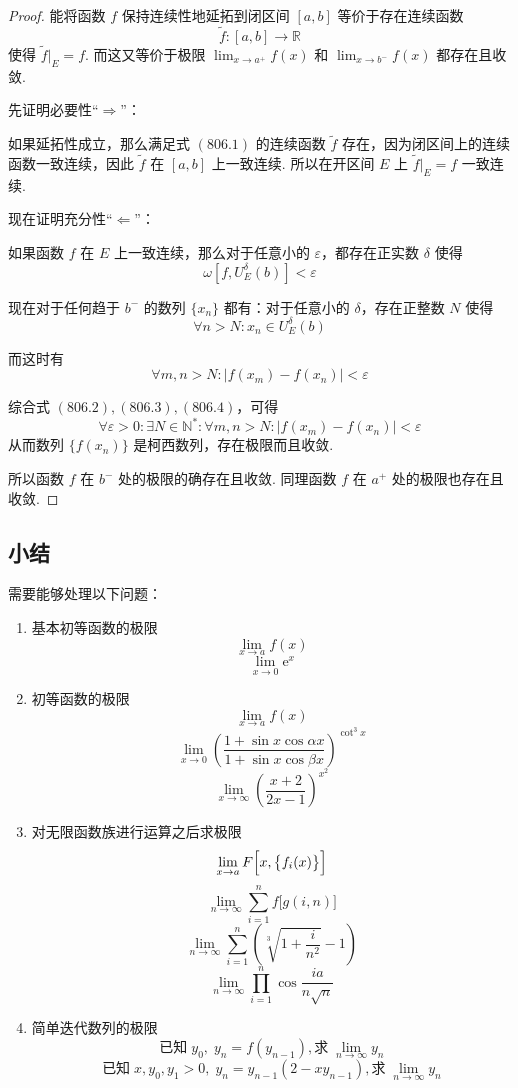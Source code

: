 \begin{proof}
    能将函数 $f$ 保持连续性地延拓到闭区间 $[a,b]$ 等价于存在连续函数
    \[\tilde{f}: [a,b] \rightarrow \mathbb{R} \tag{806.1}\]
    使得 $\tilde{f}|_E = f$. 而这又等价于极限 $\displaystyle \lim_{x \rightarrow a^+} f(x)$ 和 $\displaystyle \lim_{x \rightarrow b^-} f(x)$ 都存在且收敛.

    先证明必要性“$\Rightarrow$”：

    如果延拓性成立，那么满足式 $(806.1)$ 的连续函数 $\tilde{f}$ 存在，因为闭区间上的连续函数一致连续，因此 $\tilde{f}$ 在 $[a,b]$ 上一致连续. 所以在开区间 $E$ 上 $\tilde{f}|_E = f$ 一致连续.

    现在证明充分性“$\Leftarrow$”：

    如果函数 $f$ 在 $E$ 上一致连续，那么对于任意小的 $\varepsilon$，都存在正实数 $\delta$ 使得
    \[\omega[f, U_E^\delta(b)] < \varepsilon \tag{806.2}\]

    现在对于任何趋于 $b^-$ 的数列 $\{x_n\}$ 都有：对于任意小的 $\delta$，存在正整数 $N$ 使得
    \[\forall n > N: x_n \in U_E^\delta(b) \tag{806.3}\]

    而这时有
    \[\forall m,n > N: \lvert f(x_m) - f(x_n)\rvert < \varepsilon \tag{806.4}\]

    综合式 $(806.2),(806.3),(806.4)$，可得
    \[\forall \varepsilon > 0: \exists N \in \mathbb{N}^*: \forall m,n > N: \lvert f(x_m) - f(x_n)\rvert < \varepsilon \tag{806.5}\]
    从而数列 $\{f(x_n)\}$ 是柯西数列，存在极限而且收敛.

    所以函数 $f$ 在 $b^-$ 处的极限的确存在且收敛. 同理函数 $f$ 在 $a^+$ 处的极限也存在且收敛.
\end{proof}

\subsection{小结}
需要能够处理以下问题：

\begin{enumerate}
    \item 基本初等函数的极限
    \[\lim_{x \rightarrow a} f(x)\]
    \[\lim_{x \rightarrow 0} \mathrm{e}^{x}\]
    \item 初等函数的极限
    \[\lim_{x \rightarrow a} f(x)\]
    \[\lim_{x \rightarrow 0} \left(\frac{1 + \sin x \cos \alpha x}{1 + \sin x \cos \beta x}\right)^{\cot^3 x}\]
    \[\lim_{x \rightarrow \infty} \left(\frac{x + 2}{2x - 1}\right)^{x^2}\]
    \item 对无限函数族进行运算之后求极限
    \[\lim_{x \rightarrow a} F\Bigl[x,\bigl\{f_i(x)\bigr\}\Bigr]\]
    \[\lim_{n \rightarrow \infty} \sum_{i=1}^{n} f\bigl[g(i,n)\bigr]\]
    \[\lim_{n \rightarrow \infty} \sum_{i=1}^{n} \left(\sqrt[3]{1 + \frac{i}{n^2}} - 1\right)\]
    \[\lim_{n \rightarrow \infty} \prod_{i=1}^{n} \cos \frac{ia}{n\sqrt{n}}\]
    \item 简单迭代数列的极限
    \[\text{已知} \;y_0,\; y_n = f(y_{n-1}), \text{求} \;\lim_{n \rightarrow \infty} y_n\]
    \[\text{已知} \;x, y_0, y_1 > 0,\; y_n = y_{n-1} (2 - xy_{n-1}), \text{求} \;\lim_{n \rightarrow \infty} y_n\]
\end{enumerate}

